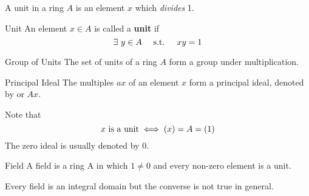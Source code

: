 A unit in a ring \( A \) is an element \( x \)
which \textit{divides} 1.
\begin{defn}{Unit}{}
	An element \( x \in A \) is called a \textbf{unit} if
	\[
		\exists\ y \in A \quad \text{ s.t. } \quad xy = 1
	\]
\end{defn}

\begin{theorem}{Group of Units}{}
	The set of units of a ring \( A \) form a group
	under multiplication.
\end{theorem}

\begin{defn}{Principal Ideal}{}
	The multiples \( ax \) of an element \( x \) form a principal ideal,
	denoted by  or \( Ax \).
\end{defn}

Note that
\[
	x \text{ is a unit} \iff \left( x \right) = A = \left( 1 \right)
\]
The zero ideal  is usually denoted by 0.

\begin{defn}{Field}{}
	A field is a ring A in which \( 1 \neq 0 \) and every non-zero
	element is a unit.
\end{defn}
Every field is an integral domain but the converse is not true in general.

